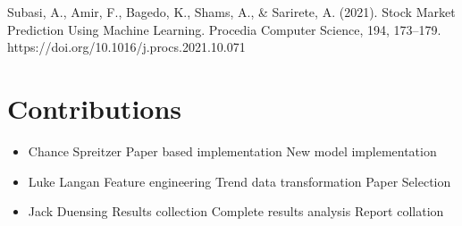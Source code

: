 \documentclass[11pt]{article}
\begin{document}
	Subasi, A., Amir, F., Bagedo, K., Shams, A., \& Sarirete, A. (2021). Stock Market Prediction Using Machine Learning. Procedia Computer Science, 194, 173–179. \\
	https://doi.org/10.1016/j.procs.2021.10.071
	
	\break
	\section{Contributions}
	
		\begin{itemize}
			\item Chance Spreitzer
				\subitem Paper based implementation
				\subitem New model implementation  
			\item Luke Langan
				\subitem Feature engineering
				\subitem Trend data transformation
				\subitem Paper Selection
			\item Jack Duensing
				\subitem Results collection
				\subitem Complete results analysis
				\subitem Report collation
		\end{itemize}
	
\end{document}
